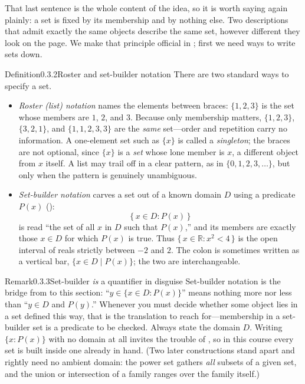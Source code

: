 \documentclass[main.tex]{subfiles}
\begin{document}
\noindent That last sentence is the whole content of the idea, so it is worth saying again plainly: a
set is fixed by its membership and by nothing else. Two descriptions that admit exactly the same
objects describe the same set, however different they look on the page. We make that principle
official in ; first we need ways to write sets down.

\begin{Obj}{Definition}{0.3.2}{Roster and set-builder notation}
There are two standard ways to specify a set.
\begin{itemize}
  \item \emph{Roster (list) notation} names the elements between braces:
        $\{1,2,3\}$ is the set whose members are $1$, $2$, and $3$. Because only membership matters,
        $\{1,2,3\}$, $\{3,2,1\}$, and $\{1,1,2,3,3\}$ are the \emph{same} set---order and repetition
        carry no information. A one-element set such as $\{x\}$ is called a \emph{singleton}; the
        braces are not optional, since $\{x\}$ is a \emph{set} whose lone member is $x$, a different
        object from $x$ itself. A list may trail off in a clear pattern, as in $\{0,1,2,3,\dots\}$,
        but only when the pattern is genuinely unambiguous.
  \item \emph{Set-builder notation} carves a set out of a known domain $D$ using a predicate $P(x)$
        ():
        \[
        \{\,x\in D : P(x)\,\}
        \]
        is read ``the set of all $x$ in $D$ such that $P(x)$,'' and its members are exactly those
        $x\in D$ for which $P(x)$ is true. Thus $\{\,x\in\mathbb R : x^2<4\,\}$ is the open interval
        of reals strictly between $-2$ and $2$. The colon is sometimes written as a vertical bar,
        $\{x\in D \mid P(x)\}$; the two are interchangeable.
\end{itemize}
\end{Obj}

\begin{ObjL}{Remark}{0.3.3}{Set-builder \emph{is} a quantifier in disguise}
Set-builder notation is the bridge from  to this section: ``$y\in\{x\in D:P(x)\}$'' means
nothing more nor less than ``$y\in D$ and $P(y)$.'' Whenever you must decide whether some object lies
in a set defined this way, that is the translation to reach for---membership in a set-builder set is a
predicate to be checked. Always state the domain $D$. Writing $\{x : P(x)\}$ with no domain at all
invites the trouble of , so in this course every set is built inside one already in hand.
(Two later constructions stand apart and rightly need no ambient domain: the power set 
gathers \emph{all} subsets of a given set, and the union or intersection of a family 
ranges over the family itself.)
\end{ObjL}
\end{document}
